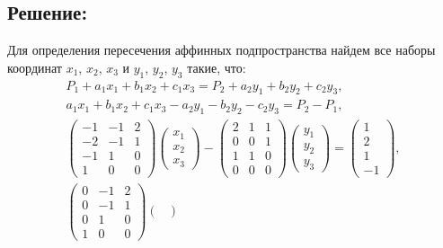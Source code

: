 \documentclass[12pt]{article}
\begin{document}
    \subsection*{Решение:}
    Для определения пересечения аффинных подпространства найдем все наборы координат $x_1$, $x_2$, $x_3$ и $y_1$, $y_2$, $y_3$ такие, что:
    \begin{gather*}
        P_1 + a_1 x_1 + b_1 x_2 + c_1 x_3 = P_2 + a_2 y_1 + b_2 y_2 + c_2 y_3 , \\
        a_1 x_1 + b_1 x_2 + c_1 x_3 - a_2 y_1 - b_2 y_2 - c_2 y_3 = P_2 - P_1 , \\
        \begin{pmatrix}
            -1 & -1 & 2 \\
            -2 & -1 & 1 \\
            -1 & 1  & 0 \\
            1  & 0  & 0
        \end{pmatrix}
        \begin{pmatrix}
            x_1 \\ x_2 \\ x_3
        \end{pmatrix}
        -
        \begin{pmatrix}
            2 & 1 & 1 \\
            0 & 0 & 1 \\
            1 & 1 & 0 \\
            0 & 0 & 0
        \end{pmatrix}
        \begin{pmatrix}
            y_1 \\ y_2 \\ y_3
        \end{pmatrix}
        =
        \begin{pmatrix}
            1 \\
            2 \\
            1 \\
            -1
        \end{pmatrix} , \\
        \begin{pmatrix}
            0 & -1 & 2 \\
            0 & -1 & 1 \\
            0 & 1  & 0 \\
            1 & 0  & 0
        \end{pmatrix}
        \begin{pmatrix}

\end{pmatrix}
\end{gather*}
\end{document}

